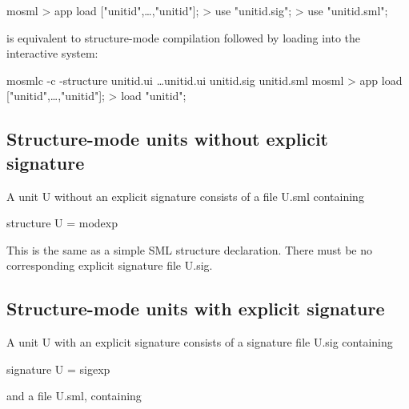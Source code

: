 \documentclass[fleqn,a4paper]{article}
\begin{document}
\begin{program}
mosml
> app load ["unitid\et",\ldots,"unitid\n"];
> use "unitid.sig";
> use "unitid.sml";
\end{program}

\noindent is equivalent to structure-mode compilation followed by
loading into the interactive system:

\begin{program}
mosmlc -c -structure unitid\et.ui \ldots unitid\n.ui unitid.sig unitid.sml 
mosml
> app load ["unitid\et",\ldots,"unitid\n"];
> load "unitid";
\end{program}



\subsection{Structure-mode units without explicit signature}
\label{sec-units-without}

A unit U without an explicit signature consists of a file U.sml
containing 

\begin{program}
  structure U = {\rm modexp}
\end{program}


\noindent This is the same as a simple SML structure declaration.
There must be no corresponding explicit signature file U.sig.


\subsection{Structure-mode units with explicit signature}
\label{sec-units-with}

A unit U with an explicit signature consists of a signature file
U.sig containing


\begin{program}
signature U = {\rm sigexp}
\end{program}

\noindent and a file U.sml, containing

\end{document}
